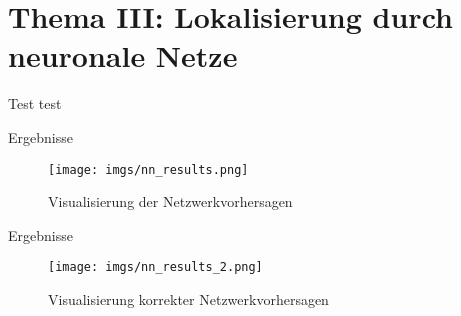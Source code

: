 \section{Thema III: Lokalisierung durch neuronale Netze}

\begin{frame}{Test}
    test
\end{frame}

\begin{frame}{Ergebnisse}
    \begin{figure}
        \centering
        \texttt{[image: imgs/nn\_results.png]}
        \caption{Visualisierung der Netzwerkvorhersagen}
    \end{figure}
\end{frame}

\begin{frame}{Ergebnisse}
    \begin{figure}
        \centering
        \texttt{[image: imgs/nn\_results\_2.png]}
        \caption{Visualisierung korrekter Netzwerkvorhersagen}
    \end{figure}
\end{frame}
